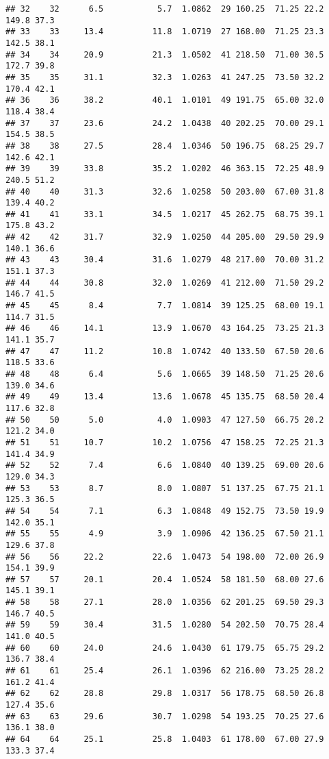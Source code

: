\documentclass[
]{book}
\theoremstyle{definition}
\theoremstyle{definition}
\theoremstyle{definition}
\theoremstyle{definition}
\theoremstyle{remark}
\begin{document}
\begin{verbatim}
## 32    32      6.5           5.7  1.0862  29 160.25  71.25 22.2    149.8 37.3
## 33    33     13.4          11.8  1.0719  27 168.00  71.25 23.3    142.5 38.1
## 34    34     20.9          21.3  1.0502  41 218.50  71.00 30.5    172.7 39.8
## 35    35     31.1          32.3  1.0263  41 247.25  73.50 32.2    170.4 42.1
## 36    36     38.2          40.1  1.0101  49 191.75  65.00 32.0    118.4 38.4
## 37    37     23.6          24.2  1.0438  40 202.25  70.00 29.1    154.5 38.5
## 38    38     27.5          28.4  1.0346  50 196.75  68.25 29.7    142.6 42.1
## 39    39     33.8          35.2  1.0202  46 363.15  72.25 48.9    240.5 51.2
## 40    40     31.3          32.6  1.0258  50 203.00  67.00 31.8    139.4 40.2
## 41    41     33.1          34.5  1.0217  45 262.75  68.75 39.1    175.8 43.2
## 42    42     31.7          32.9  1.0250  44 205.00  29.50 29.9    140.1 36.6
## 43    43     30.4          31.6  1.0279  48 217.00  70.00 31.2    151.1 37.3
## 44    44     30.8          32.0  1.0269  41 212.00  71.50 29.2    146.7 41.5
## 45    45      8.4           7.7  1.0814  39 125.25  68.00 19.1    114.7 31.5
## 46    46     14.1          13.9  1.0670  43 164.25  73.25 21.3    141.1 35.7
## 47    47     11.2          10.8  1.0742  40 133.50  67.50 20.6    118.5 33.6
## 48    48      6.4           5.6  1.0665  39 148.50  71.25 20.6    139.0 34.6
## 49    49     13.4          13.6  1.0678  45 135.75  68.50 20.4    117.6 32.8
## 50    50      5.0           4.0  1.0903  47 127.50  66.75 20.2    121.2 34.0
## 51    51     10.7          10.2  1.0756  47 158.25  72.25 21.3    141.4 34.9
## 52    52      7.4           6.6  1.0840  40 139.25  69.00 20.6    129.0 34.3
## 53    53      8.7           8.0  1.0807  51 137.25  67.75 21.1    125.3 36.5
## 54    54      7.1           6.3  1.0848  49 152.75  73.50 19.9    142.0 35.1
## 55    55      4.9           3.9  1.0906  42 136.25  67.50 21.1    129.6 37.8
## 56    56     22.2          22.6  1.0473  54 198.00  72.00 26.9    154.1 39.9
## 57    57     20.1          20.4  1.0524  58 181.50  68.00 27.6    145.1 39.1
## 58    58     27.1          28.0  1.0356  62 201.25  69.50 29.3    146.7 40.5
## 59    59     30.4          31.5  1.0280  54 202.50  70.75 28.4    141.0 40.5
## 60    60     24.0          24.6  1.0430  61 179.75  65.75 29.2    136.7 38.4
## 61    61     25.4          26.1  1.0396  62 216.00  73.25 28.2    161.2 41.4
## 62    62     28.8          29.8  1.0317  56 178.75  68.50 26.8    127.4 35.6
## 63    63     29.6          30.7  1.0298  54 193.25  70.25 27.6    136.1 38.0
## 64    64     25.1          25.8  1.0403  61 178.00  67.00 27.9    133.3 37.4

\end{verbatim}
\end{document}
